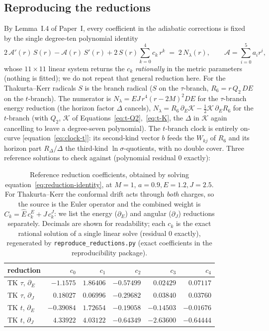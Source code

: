 \documentclass[12pt]{iopart}
\theoremstyle{plain}
\theoremstyle{definition}
\theoremstyle{remark}
\newcommand{\Ehat}{\hat E}
\begin{document}
\subsection{Reproducing the reductions}
\label{app:reproduce}
By Lemma~I.4 of Paper~I, every coefficient in the adiabatic corrections is fixed by the
single degree-ten polynomial identity
\begin{equation}
    2\,\mathcal{A}'(r)\,S(r)-\mathcal{A}(r)\,S'(r)
    +2\,S(r)\sum_{k=0}^4 c_k\,r^k \;=\; 2\,N_\lambda(r),
    \qquad \mathcal{A}=\sum_{i=0}^5 a_i r^i,
    \label{eq:reduction-identity}
\end{equation}
whose $11\times11$ linear system returns the $c_k$ \emph{rationally} in the metric
parameters (nothing is fitted); we do not repeat that general reduction here. For the
Thakurta--Kerr radicals $S$ is the branch radical ($S$ on the $\tau$-branch,
$R_6=r\,Q_2\,DE$ on the $t$-branch). The
numerator is $N_\lambda=EJ\,r^4(r-2M)^2 DE$ for the $\tau$-branch energy reduction
(the horizon factor $\Delta$ cancels), $N_\lambda=R_6\,\partial_E\mathcal K
-\tfrac12\mathcal K\,\partial_E R_6$ for the $t$-branch (with $Q_2$, $\mathcal K$ of
Equations~\eqref{eq:t-Q2},~\eqref{eq:t-K}, the $\Delta$ in $\mathcal K$ again cancelling to
leave a degree-seven polynomial). The $t$-branch clock is entirely on-curve
[equation~\eqref{eq:clock-t}]: its second-kind vector $b$ feeds the $W_{kj}$ of $R_6$ and
its horizon part $R_\Delta/\Delta$ the third-kind $\ln\sigma$-quotients, with no
double cover. Three reference solutions to check against (polynomial residual $0$
exactly):
\begin{table}[htbp]
    \centering
    \caption{Reference reduction coefficients, obtained by solving
    equation~\eqref{eq:reduction-identity}, at $M{=}1$, $a{=}0.9,E{=}1.2,J{=}2.5$. For
    Thakurta--Kerr the conformal drift acts through \emph{both} charges, so the source
    is the Euler operator and the combined weight is $C_k=\Ehat\,c_k^{E}+J\,c_k^{J}$:
    we list the energy ($\partial_E$) and angular ($\partial_J$) reductions separately.
    Decimals are shown for readability; each $c_k$ is the
    exact rational solution of a single linear solve (residual $0$ exactly), regenerated
    by \texttt{reproduce\_reductions.py} (exact coefficients in the reproducibility
    package).}
    \label{tab:reduction-ck}
    \small
    \begin{tabular}{lrrrrr}
        \hline\hline
        reduction & $c_0$ & $c_1$ & $c_2$ & $c_3$ & $c_4$\\
        \hline
        TK $\tau$, $\partial_E$ & $-1.1575$ & $1.86406$ & $-0.57499$ & $0.02429$ & $0.07117$\\
        TK $\tau$, $\partial_J$ & $0.18027$ & $0.06996$ & $-0.29682$ & $0.03840$ & $0.03760$\\
        TK $t$, $\partial_E$ & $-0.39084$ & $1.72654$ & $-0.19058$ & $-0.14503$ & $-0.01676$\\
        TK $t$, $\partial_J$ & $4.33922$ & $4.03122$ & $-0.64349$ & $-2.63600$ & $-0.64444$\\
        \hline\hline
    \end{tabular}
\end{table}
\end{document}
